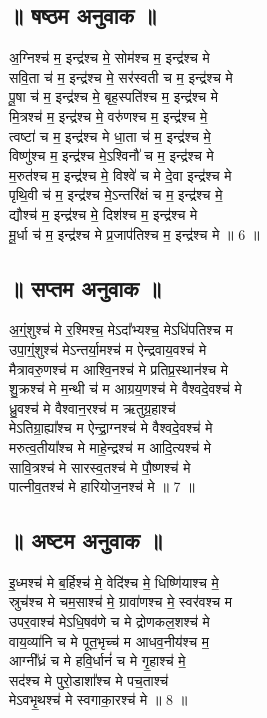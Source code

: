 \subsection{॥ षष्ठम अनुवाक ॥}
अ॒ग्निश्च॑ म॒ इन्द्र॑श्च मे॒ सोम॑श्च म॒ इन्द्र॑श्च मे\\
सवि॒ता च॑ म॒ इन्द्र॑श्च मे॒ सर॑स्वती च म॒ इन्द्र॑श्च मे\\
पू॒षा च॑ म॒ इन्द्र॑श्च मे॒ बृह॒स्पति॑श्च म॒ इन्द्र॑श्च मे\\
मि॒त्रश्च॑ म॒ इन्द्र॑श्च मे॒ वरु॑णश्च म॒ इन्द्र॑श्च मे॒\\
त्वष्टा॑ च म॒ इन्द्र॑श्च मे धा॒ता च॑ म॒ इन्द्र॑श्च मे॒\\
विष्णु॑श्च म॒ इन्द्र॑श्च मे॒ऽश्विनौ॑ च म॒ इन्द्र॑श्च मे\\
म॒रुत॑श्च म॒ इन्द्र॑श्च मे॒ विश्वे॑ च मे दे॒वा इन्द्र॑श्च मे\\
पृथि॒वी च॑ म॒ इन्द्र॑श्च मे॒ऽन्तरि॑क्षं च म॒ इन्द्र॑श्च मे॒\\
द्यौश्च॑ म॒ इन्द्र॑श्च मे॒ दिश॑श्च म॒ इन्द्र॑श्च मे\\
मू॒र्धा च॑ म॒ इन्द्र॑श्च मे प्र॒जाप॑तिश्च म॒ इन्द्र॑श्च मे ॥ 6 ॥\\
\subsection{॥ सप्तम अनुवाक ॥}
अ॒ग्ं॒शुश्च॑ मे र॒श्मिश्च॒ मेऽदा᳚भ्यश्च॒ मेऽधि॑पतिश्च म\\
उपा॒ग्ं॒शुश्च॑ मेऽन्तर्या॒मश्च॑ म ऐन्द्रवाय॒वश्च॑ मे\\
मैत्रावरु॒णश्च॑ म आश्वि॒नश्च॑ मे प्रतिप्र॒स्थान॑श्च मे\\
शु॒क्रश्च॑ मे म॒न्थी च॑ म आग्रय॒णश्च॑ मे वैश्वदे॒वश्च॑ मे\\
ध्रु॒वश्च॑ मे वैश्वान॒रश्च॑ म ऋतुग्र॒हाश्च॑\\
मेऽतिग्रा॒ह्या᳚श्च म ऐन्द्रा॒ग्नश्च॑ मे वैश्वदे॒वश्च॑ मे\\
मरुत्व॒तीया᳚श्च मे माहे॒न्द्रश्च॑ म आदि॒त्यश्च॑ मे\\
सावि॒त्रश्च॑ मे सारस्व॒तश्च॑ मे पौ॒ष्णश्च॑ मे\\
पात्नीव॒तश्च॑ मे हारियोज॒नश्च॑ मे ॥ 7 ॥\\
\subsection{॥ अष्टम अनुवाक ॥}
इ॒ध्मश्च॑ मे ब॒र्हिश्च॑ मे॒ वेदि॑श्च मे॒ धिष्णि॑याश्च मे॒\\
स्रुच॑श्च मे चम॒साश्च॑ मे॒ ग्रावा॑णश्च मे॒ स्वर॑वश्च म\\
उपर॒वाश्च॑ मेऽधि॒षव॑णे च मे द्रोणकल॒शश्च॑ मे\\
वाय॒व्या॑नि च मे पूत॒भृच्च॑ म आधव॒नीय॑श्च म॒\\
आग्नी᳚ध्रं च मे हवि॒र्धानं॑ च मे गृ॒हाश्च॑ मे॒\\
सद॑श्च मे पुरो॒डाशा᳚श्च मे पच॒ताश्च॑\\
मेऽवभृ॒थश्च॑ मे स्वगाका॒रश्च॑ मे ॥ 8 ॥\\
